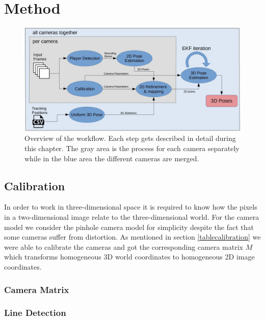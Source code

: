 \chapter{Method}\label{chap:method}
\begin{figure}[h]
	\centering
	\includegraphics[width=1.0\textwidth]{./images/overview.jpg}
	\caption{Overview of the workflow. Each step gets described in detail during this chapter. The gray area is the process for each camera separately while in the blue area the different cameras are merged.}
	\label{fig:overview}
\end{figure}

\section{Calibration}\label{sec:calibration}
In order to work in three-dimensional space it is required to know how the pixels in a two-dimensional image relate to the three-dimensional world. For the camera model we consider the pinhole camera model for simplicity despite the fact that some cameras suffer from distortion. As mentioned in section \ref{tablecalibration} we were able to calibrate the cameras and got the corresponding camera matrix $M$ which transforms homogeneous 3D world coordinates to homogeneous 2D image coordinates. 

\subsection{Camera Matrix}\label{sec:cameramatrix}

\subsection{Line Detection}

